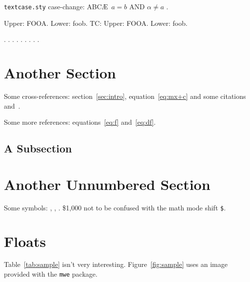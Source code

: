 \documentclass{article}
\begin{document}
\texttt{textcase.sty} case-change: \MakeTextUppercase{abc\ae\ \( a = b \) and 
$\alpha \neq a$ }.

\newcommand{\foo}{fooa}
\newcommand{\FOO}{foob}
Upper: \uppercase{\foo}. Lower: \lowercase{\FOO}.
TC: Upper: \MakeTextUppercase{\foo}. Lower:
\MakeTextLowercase{\FOO}.

.
.
.
.
.
.
.
.
.

\section{Another Section}

Some cross-references: section~\ref{sec:intro},
equation~\ref{eq:mx+c} and some
citations~\cite{article-full,incollection-full}
and~\cite[some text]{inproceedings-full}.

Some more references: equations~\ref{eq:f} and~\ref{eq:df}.

\lipsum[2-3]

\subsection{A Subsection}

\lipsum[6-7]

\section*{Another Unnumbered Section}

Some symbols: , , . \$1,000 not to be
confused with the math mode shift \verb|$|.

\lipsum[8-9]

\section{Floats}
\label{sec:floats}

Table~\ref{tab:sample} isn't very interesting.
Figure~\ref{fig:sample} uses an image provided with the 
\texttt{mwe} package.
\end{document}
